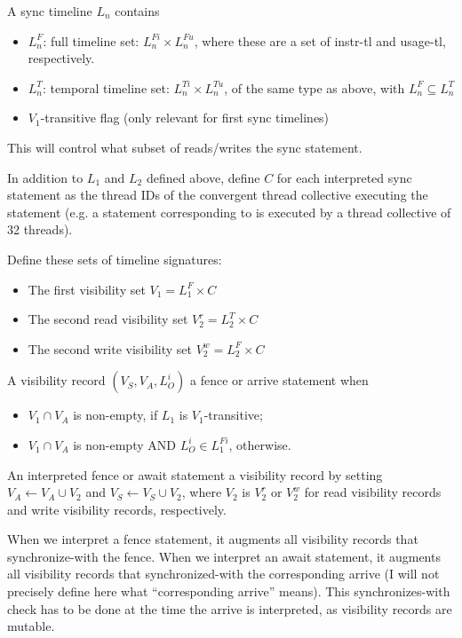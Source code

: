 A sync timeline $L_n$ contains
\begin{itemize}
  \item $L_n^F$: full timeline set: $L_n^{Fi} \times L_n^{Fu}$, where these are a set of instr-tl and usage-tl, respectively.
  \filbreak
  \item $L_n^T$: temporal timeline set: $L_n^{Ti} \times L_n^{Tu}$, of the same type as above, with $L_n^F \subseteq L_n^T$
  \filbreak
  \item $V_1$-transitive flag (only relevant for first sync timelines)
\end{itemize}
\filbreak
This will control what subset of reads/writes  the sync statement.

\filbreak
{}

In addition to $L_1$ and $L_2$ defined above, define $C$ for each interpreted sync statement as the thread IDs of the convergent thread collective executing the statement (e.g. a statement corresponding to  is executed by a thread collective of 32 threads).

\filbreak
Define these sets of timeline signatures:
\begin{itemize}
  \item The first visibility set $V_1 = L_1^F \times C$
  \item The second read visibility set $V_2^r = L_2^T \times C$
  \item The second write visibility set $V_2^w = L_2^F \times C$
\end{itemize}

\filbreak
A visibility record $(V_S, V_A, L_O^i)$  a fence or arrive statement when
\begin{itemize}
  \item $V_1 \cap V_A$ is non-empty, if $L_1$ is $V_1$-transitive;
  \filbreak
  \item $V_1 \cap V_A$ is non-empty AND $L_O^i \in L_1^{Fi}$, otherwise.
\end{itemize}
\filbreak

\filbreak
An interpreted fence or await statement  a visibility record by setting $V_A \leftarrow V_A \cup V_2$ and $V_S \leftarrow V_S \cup V_2$, where $V_2$ is $V_2^r$ or $V_2^w$ for read visibility records and write visibility records, respectively.

\filbreak
When we interpret a fence statement, it augments all visibility records that synchronize-with the fence.
When we interpret an await statement, it augments all visibility records that synchronized-with the corresponding arrive
(I will not precisely define here what ``corresponding arrive'' means).
This synchronizes-with check has to be done at the time the arrive is interpreted, as visibility records are mutable.

